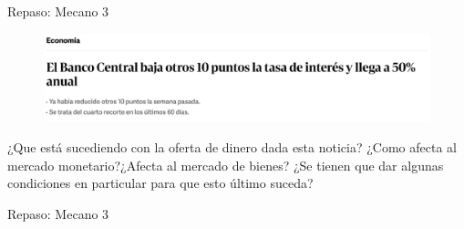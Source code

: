 \documentclass{beamer}
\begin{document}
\begin{frame}{Repaso: Mecano 3}

    \begin{figure}[h!]
        \centering
        \includegraphics[width=1\textwidth]{../Figures/ejercicio_noticia3.jpg}
    \end{figure}
    ¿Que está sucediendo con la oferta de dinero dada esta noticia? ¿Como afecta al mercado monetario?¿Afecta al mercado de bienes? ¿Se tienen que dar algunas condiciones en particular para que esto último suceda?
\end{frame}

\begin{frame}{Repaso: Mecano 3}
    
\end{frame}
\end{document}
